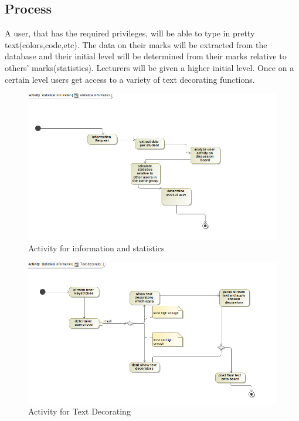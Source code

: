 \documentclass[a4paper,12pt]{article}
\begin{document}
\subsection{Process}
A user, that has the required privileges, will be able to type in pretty text(colors,code,etc). The data on their marks will be extracted from the database and their initial level will be determined from their marks relative to others' marks(statistics). Lecturers will be given a higher initial level. Once on a certain level users get access to a variety of text decorating functions.

\begin{figure}[ht!]
\centering
\includegraphics[width=120mm]{images/capture3.png}
\caption{Activity for information and statistics \label{overflow}}
\end{figure}

\begin{figure}[ht!]
\centering
\includegraphics[width=120mm]{images/capture4.png}
\caption{Activity for Text Decorating \label{overflow}}
\end{figure}

 
 
\end{document}
